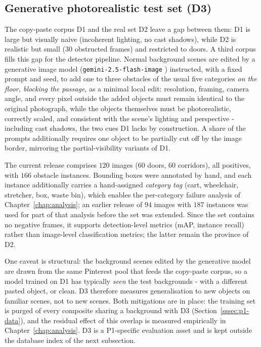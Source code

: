 \subsection{Generative photorealistic test set (D3)}
\label{ssec:ds-gemini}

The copy-paste corpus D1 and the real set D2 leave a gap between them: D1 is
large but visually naive (incoherent lighting, no cast shadows), while D2 is
realistic but small ($30$ obstructed frames) and restricted to doors. A third
corpus fills this gap for the detector pipeline. Normal background scenes are
edited by a generative image model (\texttt{gemini-2.5-flash-image}
\cite{GoogleGeminiImage2025}) instructed, with a fixed prompt and seed, to add
one to three obstacles of the usual five categories \emph{on the floor,
blocking the passage}, as a minimal local edit: resolution, framing, camera
angle, and every pixel outside the added objects must remain identical to the
original photograph, while the objects themselves must be photorealistic,
correctly scaled, and consistent with the scene's lighting and perspective -
including cast shadows, the two cues D1 lacks by construction. A share of the
prompts additionally requires one object to be partially cut off by the image
border, mirroring the partial-visibility variants of D1.

The current release comprises $120$ images ($60$ doors, $60$ corridors), all
positives, with $166$ obstacle instances. Bounding boxes were annotated by
hand, and each instance additionally carries a hand-assigned \emph{category
tag} (cart, wheelchair, stretcher, box, waste bin), which enables the
per-category failure analysis of Chapter~\ref{chap:analysis}; an earlier
release of $94$ images with $187$ instances was used for part of that analysis
before the set was extended. Since the set contains no negative frames, it
supports detection-level metrics (mAP, instance recall) rather than image-level
classification metrics; the latter remain the province of D2.

One caveat is structural: the background scenes edited by the generative model
are drawn from the same Pinterest pool that feeds the copy-paste corpus, so a
model trained on D1 has typically \emph{seen} the test backgrounds - with a
different pasted object, or clean. D3 therefore measures generalisation to new
objects on familiar scenes, not to new scenes. Both mitigations are in place:
the training set is purged of every composite sharing a background with D3
(Section~\ref{sssec:p1-data}), and the residual effect of this overlap is
measured empirically in Chapter~\ref{chap:analysis}. D3 is a P1-specific
evaluation asset and is kept outside the database index of the next subsection.

